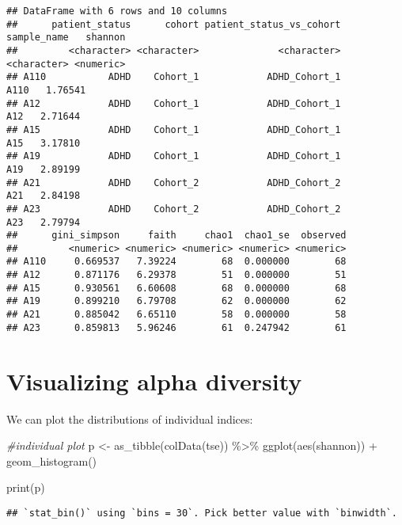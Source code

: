 \documentclass[
  oneside]{book}
\newenvironment{Shaded}{\begin{snugshade}}{\end{snugshade}}
\newcommand{\CommentTok}[1]{\textcolor[rgb]{0.56,0.35,0.01}{\textit{#1}}}
\newcommand{\FunctionTok}[1]{\textcolor[rgb]{0.00,0.00,0.00}{#1}}
\newcommand{\NormalTok}[1]{#1}
\newcommand{\OtherTok}[1]{\textcolor[rgb]{0.56,0.35,0.01}{#1}}
\newcommand{\SpecialCharTok}[1]{\textcolor[rgb]{0.00,0.00,0.00}{#1}}
\begin{document}
\begin{verbatim}
## DataFrame with 6 rows and 10 columns
##      patient_status      cohort patient_status_vs_cohort sample_name   shannon
##         <character> <character>              <character> <character> <numeric>
## A110           ADHD    Cohort_1            ADHD_Cohort_1        A110   1.76541
## A12            ADHD    Cohort_1            ADHD_Cohort_1         A12   2.71644
## A15            ADHD    Cohort_1            ADHD_Cohort_1         A15   3.17810
## A19            ADHD    Cohort_1            ADHD_Cohort_1         A19   2.89199
## A21            ADHD    Cohort_2            ADHD_Cohort_2         A21   2.84198
## A23            ADHD    Cohort_2            ADHD_Cohort_2         A23   2.79794
##      gini_simpson     faith     chao1  chao1_se  observed
##         <numeric> <numeric> <numeric> <numeric> <numeric>
## A110     0.669537   7.39224        68  0.000000        68
## A12      0.871176   6.29378        51  0.000000        51
## A15      0.930561   6.60608        68  0.000000        68
## A19      0.899210   6.79708        62  0.000000        62
## A21      0.885042   6.65110        58  0.000000        58
## A23      0.859813   5.96246        61  0.247942        61
\end{verbatim}

\hypertarget{visualizing-alpha-diversity}{%
\section{Visualizing alpha diversity}\label{visualizing-alpha-diversity}}

We can plot the distributions of individual indices:

\begin{Shaded}
\begin{Highlighting}[]
\CommentTok{\#individual plot}
\NormalTok{p }\OtherTok{\textless{}{-}} \FunctionTok{as\_tibble}\NormalTok{(}\FunctionTok{colData}\NormalTok{(tse)) }\SpecialCharTok{\%\textgreater{}\%} 
  \FunctionTok{ggplot}\NormalTok{(}\FunctionTok{aes}\NormalTok{(shannon)) }\SpecialCharTok{+}
  \FunctionTok{geom\_histogram}\NormalTok{() }

\FunctionTok{print}\NormalTok{(p)}
\end{Highlighting}
\end{Shaded}

\begin{verbatim}
## `stat_bin()` using `bins = 30`. Pick better value with `binwidth`.
\end{verbatim}
\end{document}
